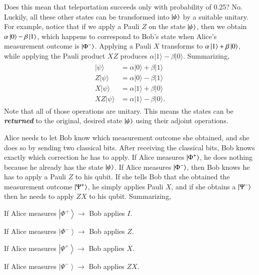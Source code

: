 Does this mean that teleportation succeeds only with probability of 0.25?
No.
Luckily, all these other states can be transformed into $\left| \psi \right\rangle$ by a suitable unitary.
For example, notice that if we apply a Pauli $Z$ on the state $\left| \psi \right\rangle$, then we obtain $\alpha\left| 0 \right\rangle-\beta\left| 1 \right\rangle$, which happens to correspond to Bob's state when Alice's measurement outcome is $\left| \Phi^- \right\rangle$.
Applying a Pauli $X$ transforms \ket{\psi} to $\alpha\left| 1 \right\rangle+\beta\left| 0 \right\rangle$, while applying the Pauli product $XZ$ produces $\alpha|1\rangle-\beta|0\rangle$.
Summarizing,
\begin{align}
\begin{aligned}
    |\psi\rangle &=\alpha|0\rangle+\beta|1\rangle \\
    Z|\psi\rangle &=\alpha|0\rangle-\beta|1\rangle \\
    X|\psi\rangle &=\alpha|1\rangle+\beta|0\rangle \\
    X Z|\psi\rangle &=\alpha|1\rangle-\beta|0\rangle.
    \label{eq:teleportation_possible_states}
\end{aligned}
\end{align}
Note that all of those operations are unitary.  This means the states can be \textbf{\emph{returned}} to the original, desired state $\left| \psi \right\rangle$ using their adjoint operations.

Alice needs to let Bob know which measurement outcome she obtained, and she does so by sending two classical bits.
After receiving the classical bits, Bob knows exactly which correction he has to apply.
If Alice measures $\left| \Phi^+ \right\rangle$, he does nothing because he already has the state $\left| \psi \right\rangle$.
If Alice measures $\left| \Phi^- \right\rangle$, then Bob knows he has to apply a Pauli $Z$ to his qubit.
If she tells Bob that she obtained the measurement outcome $\left| \Psi^+ \right\rangle$, he simply applies Pauli $X$, and if she obtains a $\left| \Psi^- \right\rangle$ then he needs to apply $ZX$ to his qubit.  Summarizing,

\hspace{2cm} If Alice measures $\left|\Phi^{+}\right\rangle \rightarrow$ Bob applies $I$.

\hspace{2cm} If Alice measures $\left|\Phi^{-}\right\rangle \rightarrow$ Bob applies $Z$.

\hspace{2cm} If Alice measures $\left|\Psi^{+}\right\rangle \rightarrow$ Bob applies $X$.

\hspace{2cm} If Alice measures $\left|\Psi^{-}\right\rangle \rightarrow$ Bob applies $Z X$.

